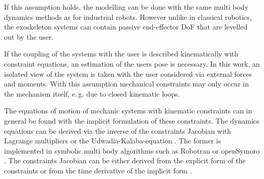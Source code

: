 \documentclass[letterpaper, 10 pt, conference]{ieeeconf}  %
\begin{document}
If this assumption holds, the modelling can be done with the same multi body dynamics methods as for industrial robots.
However unlike in classical robotics, the exoskeleton systems can contain passive end-effector DoF that are levelled out by the user.

If the coupling of the systems with the user is described kinematically with constraint equations, an estimation of the users pose is necessary.
In this work, an isolated view of the system is taken with the user considered via external forces and moments.
%
With this assumption mechanical constraints may only occur in the mechanism itself, e.\,g. due to closed kinematic loops.


The equations of motion of mechanic systems with kinematic constraints can in general be found with the implicit formulation of these constraints.
The dynamics equations can be derived via the inverse of the constraints Jacobian with Lagrange multipliers \cite{NakamuraGho1989} or the Udwadia-Kalaba-equation \cite{UdwadiaKal1992}.
The former is implemented in symbolic multi body algorithms such as Robotran \cite{SaminFis2013} or openSymoro \cite{KhalilVijKhoMuk2014}.
The constraints Jacobian can be either derived from the explicit form of the constraints \cite{NakamuraGho1989} or from the time derivative of the implicit form \cite{ParkChoPlo1999}.
\end{document}
